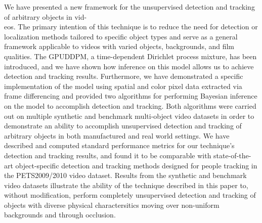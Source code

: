 \documentclass[twocolumn, final]{svjour3}
\begin{document}
We have presented a new framework for the unsupervised detection and tracking of arbitrary objects in vid-\\eos. The primary intention of this technique is to reduce the need for detection or localization methods tailored to specific object types and serve as a general framework applicable to videos with varied objects, backgrounds, and film qualities. The GPUDDPM, a time-dependent Dirichlet process mixture, has been introduced, and we have shown how inference on this model allows us to achieve detection and tracking results. Furthermore, we have demonstrated a specific implementation of the model using spatial and color pixel data extracted via frame differencing and provided two algorithms for performing Bayesian inference on the model to accomplish detection and tracking. Both algorithms were carried out on multiple synthetic and benchmark multi-object video datasets in order to demonstrate an ability to accomplish unsupervised detection and tracking of arbitrary objects in both manufactured and real world settings. We have described and computed standard performance metrics for our technique's detection and tracking results, and found it to be comparable with state-of-the-art object-specific detection and tracking methods designed for people tracking in the PETS2009/2010 video dataset. Results from the synthetic and benchmark video datasets illustrate the ability of the technique described in this paper to, without modification, perform completely unsupervised detection and tracking of objects with diverse physical charactersitics moving over non-uniform backgrounds and through occlusion.




\begin{small}

 
\end{small}
\end{document}
